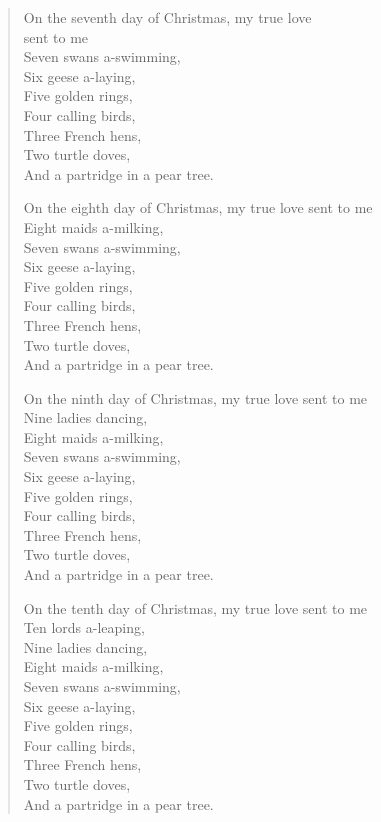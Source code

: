 \begin{verse}
\smallskip

On the seventh day of Christmas, my true love \\ \hspace*{\fill} sent to me \\
Seven swans a-swimming, \\
Six geese a-laying, \\
Five golden rings, \\
Four calling birds, \\
Three French hens, \\
Two turtle doves, \\
And a partridge in a pear tree.

\smallskip

On the eighth day of Christmas, my true love sent to me \\
Eight maids a-milking, \\
Seven swans a-swimming, \\
Six geese a-laying, \\
Five golden rings, \\
Four calling birds, \\
Three French hens, \\
Two turtle doves, \\
And a partridge in a  pear tree.

\smallskip

On the ninth day of Christmas, my true love sent to me \\
Nine ladies dancing, \\
Eight maids a-milking, \\
Seven swans a-swimming, \\
Six geese a-laying, \\
Five golden rings, \\
Four calling birds, \\
Three French hens, \\
Two turtle doves, \\
And a partridge in a pear tree.

\smallskip

On the tenth day of Christmas, my true love sent to me \\
Ten lords a-leaping, \\
Nine ladies dancing, \\
Eight maids a-milking, \\
Seven swans a-swimming, \\
Six geese a-laying, \\
Five golden rings, \\
Four calling birds, \\
Three French hens, \\
Two turtle doves, \\
And a partridge in a pear tree.


\end{verse}
